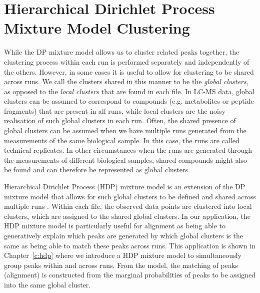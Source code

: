 \section{Hierarchical Dirichlet Process Mixture Model Clustering\label{background-hdp-clustering}}

While the DP mixture model allows us to cluster related peaks together, the clustering process within each run is performed separately and independently of the others. However, in some cases it is useful to allow for clustering to be shared across runs. We call the clusters shared in this manner to be the \emph{global clusters}, as opposed to the \emph{local clusters} that are found in each file. In LC-MS data, global clusters can be assumed to correspond to compounds (e.g. metabolites or peptide fragments) that are present in all runs, while local clusters are the noisy realisation of such global clusters in each run. Often, the shared presence of global clusters can be assumed when we have multiple runs generated from the measurements of the same biological sample. In this case, the runs are called technical replicates. In other circumstances when the runs are generated through the measurements of different biological samples, shared compounds might also be found and can therefore be represented as global clusters.

Hierarchical Dirichlet Process (HDP) mixture model is an extension of the DP mixture model that allows for such global clusters to be defined and shared across multiple runs \cite{teh2005hierarchical,teh2012hierarchical}. Within each file, the observed data points are clustered into local clusters, which are assigned to the shared global clusters. In our application, the HDP mixture model is particularly useful for alignment as being able to generatively explain which peaks are generated by which global clusters is the same as being able to match these peaks across runs. This application is shown in Chapter~\ref{c:hdp} where we introduce a HDP mixture model to simultaneously group peaks within and across runs. From the model, the matching of peaks (alignment) is constructed from the marginal probabilities of peaks to be assigned into the same global cluster. 

